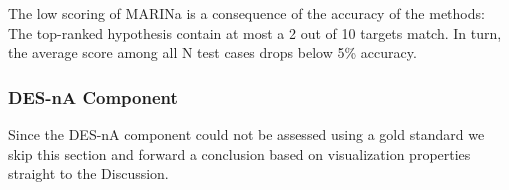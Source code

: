 The low scoring of MARINa is a consequence of the accuracy of the methods: The top-ranked hypothesis contain at most a 2 out of 10 targets match. In turn, the average score among all N test cases drops below 5\% accuracy.

\subsubsection{DES-nA Component}
Since the DES-nA component could not be assessed using a gold standard we skip this section and forward a conclusion based on visualization properties straight to the Discussion.